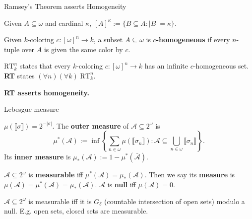 \begin{frame}{Ramsey's Theorem asserts Homogeneity}
  \begin{notation*}
    Given $A\subseteq\omega$ and cardinal $\kappa$,
    $[A]^\kappa :=\{B\subseteq A:|B|=\kappa\}$.
  \end{notation*}

  \begin{define*}[$c$-homogeneous]
    Given $k$-coloring $c:[\omega]^n\rightarrow k$, a subset
    $A\subseteq\omega$ is \textbf{$c$-homogeneous} if every $n$-tuple over
    $A$ is given the same color by $c$.
  \end{define*}

  \begin{thm*}[Ramsey's]
    \textbf{$\text{RT}_k^n$} states that every $k$-coloring
    $c:[\omega]^n\rightarrow k$ has an infinite $c$-homogeneous set.
    \textbf{RT} states $(\forall n)(\forall k)\; \text{RT}_k^n$.
  \end{thm*}

  \vspace{0.5em}
  \textbf{RT asserts homogeneity.}
\end{frame}

\begin{frame}{Lebesgue measure}
  \begin{define*}
    $\mu(\llbracket\sigma\rrbracket) =2^{-|\sigma|}$. The \textbf{outer
    measure} of $\mathcal{A}\subseteq2^\omega$ is
    \[\mu^*(\mathcal{A}):= \inf\left\{\sum_{n\in\omega}
    \mu(\llbracket\sigma_n\rrbracket): \mathcal{A}\subseteq
    \bigcup_{n\in\omega} \llbracket\sigma_n\rrbracket\right\}.\]
    Its \textbf{inner measure} is $\mu_*(\mathcal{A}):=
    1-\mu^*(\bar{\mathcal{A}})$.
  \end{define*}

  \begin{define*}
    $\mathcal{A}\subseteq2^\omega$ is \textbf{measurable} iff
    $\mu^*(\mathcal{A}) =\mu_*(\mathcal{A})$.  Then we say its
    \textbf{measure} is $\mu(\mathcal{A}) =\mu^*(\mathcal{A})
    =\mu_*(\mathcal{A})$. $\mathcal{A}$ is \textbf{null} iff
    $\mu(\mathcal{A})=0$.
  \end{define*}
  \begin{fact*}[Measurable]
    $\mathcal{A}\subseteq2^\omega$ is measurable iff it is
    $G_\delta$ (countable intersection of open sets) modulo a null. E.g.
    open sets, closed sets are measurable.
  \end{fact*}
\end{frame}

